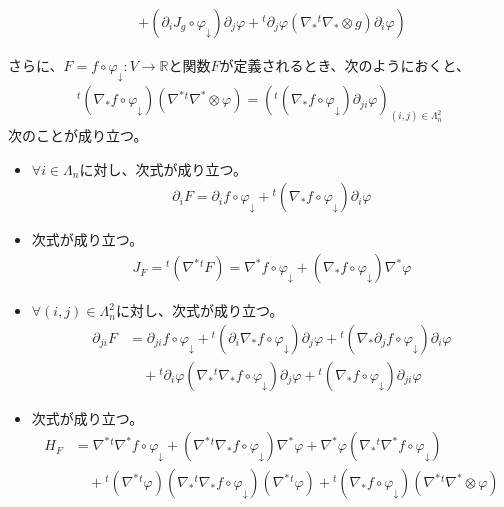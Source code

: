 \documentclass[dvipdfmx]{jsarticle}
\begin{document}
\begin{thm}
\begin{itemize}
\begin{align*}
&\quad \left. + \left( \partial_{i}J_{g} \circ \varphi_{\downarrow} \right)\partial_{j}\varphi +{}^t \partial_{j}\varphi\left( \nabla_{*}{}^{t}\nabla_{*} \otimes g \right)\partial_{i}\varphi \right)
\end{align*}
\end{itemize}
さらに、$F = f \circ \varphi_{\downarrow}:V \rightarrow \mathbb{R}$と関数$F$が定義されるとき、次のようにおくと、
\begin{align*}
{}^t \left( \nabla_{*}f \circ \varphi_{\downarrow} \right)\left( \nabla^{*}{}^t \nabla^{*} \otimes \varphi \right) = \left({}^t \left( \nabla_{*}f \circ \varphi_{\downarrow} \right)\partial_{ji}\varphi \right)_{(i,j) \in \varLambda_{n}^{2}}
\end{align*}
次のことが成り立つ。
\begin{itemize}
\item
  $\forall i \in \varLambda_{n}$に対し、次式が成り立つ。
\begin{align*}
\partial_{i}F = \partial_{i}f \circ \varphi_{\downarrow} +{}^t \left( \nabla_{*}f \circ \varphi_{\downarrow} \right)\partial_{i}\varphi
\end{align*}
\item
  次式が成り立つ。
\begin{align*}
J_{F} ={}^t \left( \nabla^{*}{}^t F \right) = \nabla^{*}f \circ \varphi_{\downarrow} + \left( \nabla_{*}f \circ \varphi_{\downarrow} \right)\nabla^{*}\varphi
\end{align*}
\item
  $\forall(i,j) \in \varLambda_{n}^{2}$に対し、次式が成り立つ。
\begin{align*}
\partial_{ji}F &= \partial_{ji}f \circ \varphi_{\downarrow} +{}^t \left( \partial_{i}\nabla_{*}f \circ \varphi_{\downarrow} \right)\partial_{j}\varphi +{}^t \left( \nabla_{*}\partial_{j}f \circ \varphi_{\downarrow} \right)\partial_{i}\varphi \\
&\quad +{}^t \partial_{i}\varphi\left( \nabla_{*}{}^t \nabla_{*}f \circ \varphi_{\downarrow} \right)\partial_{j}\varphi +{}^t \left( \nabla_{*}f \circ \varphi_{\downarrow} \right)\partial_{ji}\varphi
\end{align*}
\item
  次式が成り立つ。
\begin{align*}
H_{F} &= \nabla^{*}{}^t \nabla^{*}f \circ \varphi_{\downarrow} + \left( \nabla^{*}{}^t \nabla_{*}f \circ \varphi_{\downarrow} \right)\nabla^{*}\varphi + \nabla^{*}\varphi\left( \nabla_{*}{}^t \nabla^{*}f \circ \varphi_{\downarrow} \right) \\
&\quad +{}^t \left( \nabla^{*}{}^t \varphi \right)\left( \nabla_{*}{}^t \nabla_{*}f \circ \varphi_{\downarrow} \right)\left( \nabla^{*}{}^t \varphi \right) +{}^t \left( \nabla_{*}f \circ \varphi_{\downarrow} \right)\left( \nabla^{*}{}^t \nabla^{*} \otimes \varphi \right)
\end{align*}
\end{itemize}
\end{thm}
\end{document}
